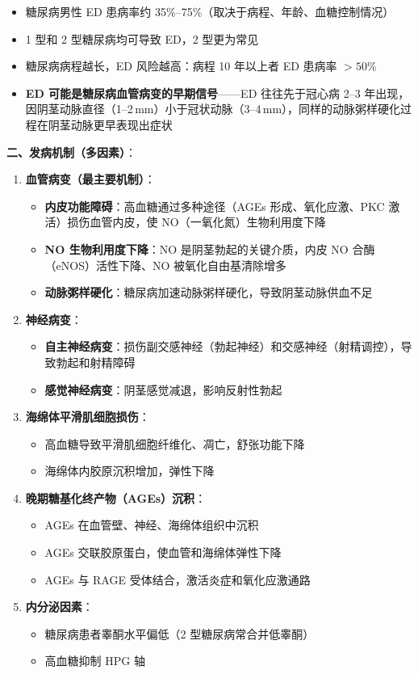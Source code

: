 \begin{itemize}[leftmargin=2cm]
	\item 糖尿病男性 ED 患病率约 35\%--75\%（取决于病程、年龄、血糖控制情况）
	\item 1 型和 2 型糖尿病均可导致 ED，2 型更为常见
	\item 糖尿病病程越长，ED 风险越高：病程 10 年以上者 ED 患病率 $>50\%$
	\item \textbf{ED 可能是糖尿病血管病变的早期信号}——ED 往往先于冠心病 2--3 年出现，因阴茎动脉直径（1--2\,mm）小于冠状动脉（3--4\,mm），同样的动脉粥样硬化过程在阴茎动脉更早表现出症状
\end{itemize}

\vspace{0.5em}
\noindent\textbf{二、发病机制（多因素）}：

\begin{enumerate}
	\item \textbf{血管病变（最主要机制）}：
	\begin{itemize}
		\item \textbf{内皮功能障碍}：高血糖通过多种途径（AGEs 形成、氧化应激、PKC 激活）损伤血管内皮，使 NO（一氧化氮）生物利用度下降
		\item \textbf{NO 生物利用度下降}：NO 是阴茎勃起的关键介质，内皮 NO 合酶（eNOS）活性下降、NO 被氧化自由基清除增多
		\item \textbf{动脉粥样硬化}：糖尿病加速动脉粥样硬化，导致阴茎动脉供血不足
	\end{itemize}

	\item \textbf{神经病变}：
	\begin{itemize}
		\item \textbf{自主神经病变}：损伤副交感神经（勃起神经）和交感神经（射精调控），导致勃起和射精障碍
		\item \textbf{感觉神经病变}：阴茎感觉减退，影响反射性勃起
	\end{itemize}

	\item \textbf{海绵体平滑肌细胞损伤}：
	\begin{itemize}
		\item 高血糖导致平滑肌细胞纤维化、凋亡，舒张功能下降
		\item 海绵体内胶原沉积增加，弹性下降
	\end{itemize}

	\item \textbf{晚期糖基化终产物（AGEs）沉积}：
	\begin{itemize}
		\item AGEs 在血管壁、神经、海绵体组织中沉积
		\item AGEs 交联胶原蛋白，使血管和海绵体弹性下降
		\item AGEs 与 RAGE 受体结合，激活炎症和氧化应激通路
	\end{itemize}

	\item \textbf{内分泌因素}：
	\begin{itemize}
		\item 糖尿病患者睾酮水平偏低（2 型糖尿病常合并低睾酮）
		\item 高血糖抑制 HPG 轴
	\end{itemize}
\end{enumerate}

